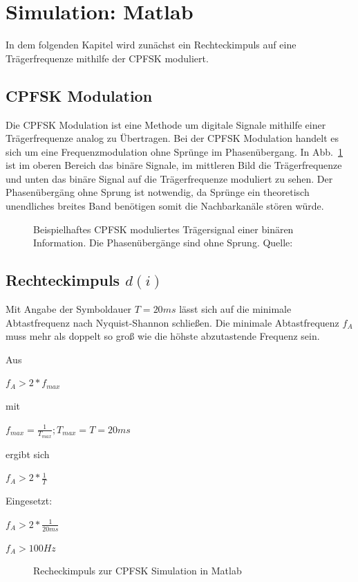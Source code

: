 \documentclass{article}
\begin{document}
\section{Simulation: Matlab}
In dem folgenden Kapitel wird zunächst ein Rechteckimpuls auf eine Trägerfrequenze mithilfe der \ac{CPFSK} moduliert.

\subsection{CPFSK Modulation}
Die \ac{CPFSK} Modulation ist eine Methode um digitale Signale mithilfe einer Trägerfrequenze analog zu Übertragen.
Bei der \ac{CPFSK} Modulation handelt es sich um eine Frequenzmodulation ohne Sprünge im Phasenübergang. In Abb.~\ref{fsk}
ist im oberen Bereich das binäre Signale, im mittleren Bild die Trägerfrequenze und unten das binäre Signal auf die Trägerfrequenze
moduliert zu sehen. Der Phasenübergäng ohne Sprung ist notwendig, da Sprünge ein theoretisch unendliches breites Band benötigen
somit die Nachbarkanäle stören würde.
\begin{figure}[!h]
    \centering
    \def\svgscale{0.3}
    \def\svgwidth{\columnwidth}
    
    \caption{Beispielhaftes \ac{CPFSK} moduliertes Trägersignal einer binären 
    Information. Die Phasenübergänge sind ohne Sprung. Quelle:~\cite{wiki:fsk}}
    \label{fsk}
\end{figure}
\subsection{Rechteckimpuls $d(i)$}\label{sec:rechteck}
Mit Angabe der Symboldauer $T = 20ms$ lässt sich auf die minimale Abtastfrequenz nach Nyquist-Shannon schließen.
Die minimale Abtastfrequenz $f_A$ muss mehr als doppelt so groß wie die höhste abzutastende Frequenz sein.


Aus
\begin{center}
 $
f_A > 2*f_{max}
$
\end{center}

mit 
\begin{center} $f_{max} = \frac{1}{T_{max}} ; T_{max} = T = 20ms$  \end{center}

ergibt sich

\begin{center}
$
f_A > 2*\frac{1}{T}
$
\end{center}

Eingesetzt:
\begin{center}
$f_A > 2*\frac{1}{20ms}$
\end{center}
\begin{center}
$f_A > 100Hz$   
\end{center}
\begin{figure}[!h]
    \centering
    \def\svgscale{0.3}
    \def\svgwidth{\columnwidth}
    
    \caption{Recheckimpuls zur \ac{CPFSK} Simulation in Matlab}
\end{figure}
\end{document}
